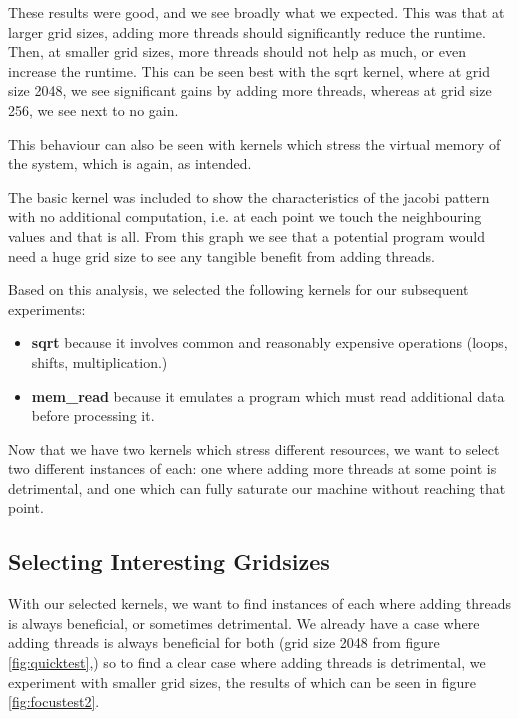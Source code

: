 These results were good, and we see broadly what we expected. This was that at larger grid sizes, adding more threads should significantly reduce the runtime. Then, at smaller grid sizes, more threads should not help as much, or even increase the runtime. This can be seen best with the sqrt kernel, where at grid size 2048, we see significant gains by adding more threads, whereas at grid size 256, we see next to no gain.

This behaviour can also be seen with kernels which stress the virtual memory of the system, which is again, as intended.

The basic kernel was included to show the characteristics of the jacobi pattern with no additional computation, i.e. at each point we touch the neighbouring values and that is all. From this graph we see that a potential program would need a huge grid size to see any tangible benefit from adding threads.

Based on this analysis, we selected the following kernels for our subsequent experiments:

\begin{itemize}
    \item \textbf{sqrt} because it involves common and reasonably expensive operations (loops, shifts, multiplication.)
    \item \textbf{mem\_read} because it emulates a program which must read additional data before processing it.
\end{itemize}

Now that we have two kernels which stress different resources, we want to select two different instances of each: one where adding more threads at some point is detrimental, and one which can fully saturate our machine without reaching that point.



\subsection{Selecting Interesting Gridsizes}
\label{section:results:selecting_interesting_gridsizes}

With our selected kernels, we want to find instances of each where adding threads is always beneficial, or sometimes detrimental. We already have a case where adding threads is always beneficial for both (grid size 2048 from figure \ref{fig:quicktest},) so to find a clear case where adding threads is detrimental, we experiment with smaller grid sizes, the results of which can be seen in figure \ref{fig:focustest2}.



